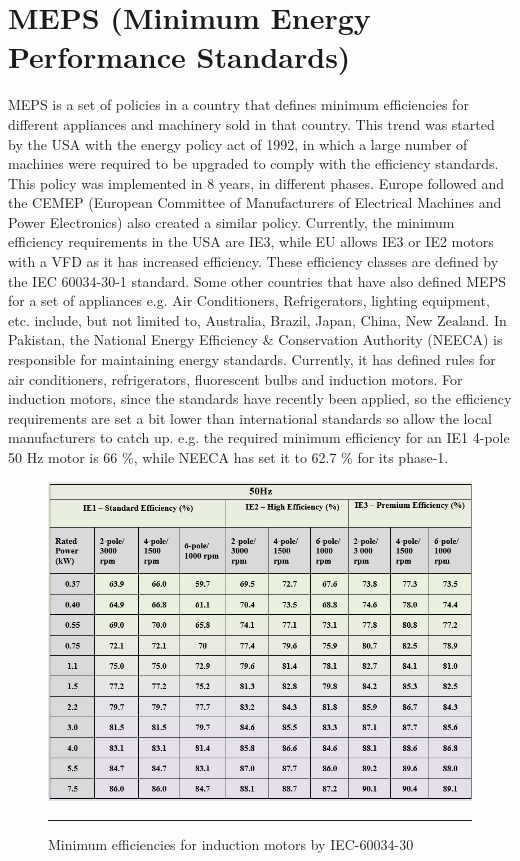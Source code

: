 \section{MEPS (Minimum Energy Performance Standards)}
MEPS is a set of policies in a country that defines minimum efficiencies for different appliances and machinery sold in that country. This trend was started by the USA with the energy policy act of 1992, in which a large number of machines were required to be upgraded to comply with the efficiency standards. This policy was implemented in 8 years, in different phases. Europe followed and the CEMEP (European Committee of Manufacturers of Electrical Machines and Power Electronics) also created a similar policy. Currently, the minimum efficiency requirements in the USA are IE3, while EU allows IE3 or IE2 motors with a VFD as it has increased efficiency\cite{doppelbauer12iec}. These efficiency classes are defined by the IEC 60034-30-1\cite{iec6003430} standard. Some other countries that have also defined MEPS for a set of appliances e.g. Air Conditioners, Refrigerators, lighting equipment, etc. include, but not limited to, Australia, Brazil, Japan, China, New Zealand\cite{dowding2019minimum}.   
In Pakistan, the National Energy Efficiency \& Conservation Authority (NEECA) is responsible for maintaining energy standards. Currently, it has defined rules for air conditioners, refrigerators, fluorescent bulbs and induction motors. For induction motors, since the standards have recently been applied, so the efficiency requirements are set a bit lower than international standards so allow the local manufacturers to catch up. e.g. the required minimum efficiency for an IE1 4-pole 50 Hz motor is 66 \%, while NEECA has set it to 62.7 \% for its phase-1.
\begin{figure}[htbp]
  \centering
    \includegraphics[width = 5in]{./Figures/MS/fig14.png}
    \rule{35em}{1.2pt}
  \caption{Minimum efficiencies for induction motors by IEC-60034-30}
  \label{fig:Minimum efficiencies for induction motors by IEC-60034-30}
\end{figure}
